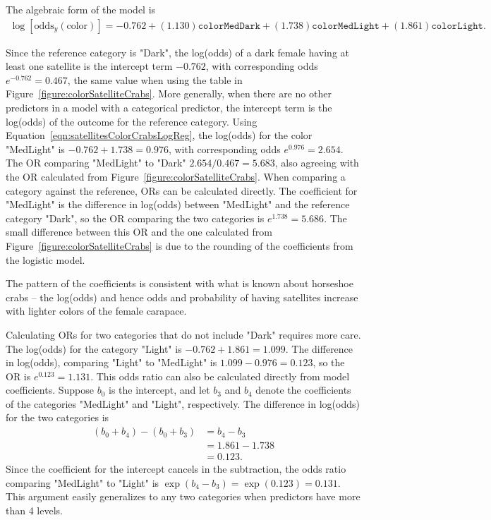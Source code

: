 The algebraic form of the model is
\begin{align}
\log\left[\text{odds}_{y}(\text{color})\right] = -0.762 + (1.130)\texttt{colorMedDark}
 + (1.738)\texttt{colorMedLight} + (1.861)\texttt{colorLight}.
 \label{eqn:satellitesColorCrabsLogReg}
\end{align}

Since the reference category is "Dark", the log(odds) of a dark female having at least one satellite is the intercept term $-0.762$, with corresponding odds $e^{-0.762} = 0.467$, the same value when using the table in Figure~\ref{figure:colorSatelliteCrabs}.  More generally, when there are no other predictors in a model with a categorical predictor, the intercept term is the log(odds) of the outcome for the reference category. Using Equation~\ref{eqn:satellitesColorCrabsLogReg}, the log(odds) for the color "MedLight" is $-0.762 + 1.738 = 0.976$, with corresponding odds $e^{0.976} = 2.654$. The OR comparing "MedLight" to "Dark" $2.654/0.467 = 5.683$, also agreeing with the OR calculated from Figure~\ref{figure:colorSatelliteCrabs}.  When comparing a category against the reference, ORs can be calculated directly.  The coefficient for "MedLight" is the difference in log(odds) between "MedLight" and the reference category "Dark", so the OR comparing the two categories is $e^{1.738} = 5.686$.  The small difference between this OR and the one calculated from Figure~\ref{figure:colorSatelliteCrabs} is due to the rounding of the coefficients from the logistic model.


The pattern of the coefficients is consistent with what is known about horseshoe crabs -- the log(odds) and hence odds and probability of having satellites increase with lighter colors of the female carapace.

Calculating ORs for two categories that do not include "Dark" requires more care.  The log(odds) for the category "Light" is $-0.762 + 1.861 = 1.099$.  The difference in log(odds), comparing "Light" to "MedLight" is $1.099 - 0.976 = 0.123$, so the OR is $e^{0.123} = 1.131$.  This odds ratio can also be calculated directly from model coefficients.  Suppose $b_0$ is the intercept, and let $b_3$ and $b_4$ denote the coefficients of the categories "MedLight" and "Light", respectively.  The difference in log(odds) for the two categories is
\begin{align*}
   (b_0 + b_4) - (b_0 + b_3) &= b_4 - b_3 \\
      &= 1.861 - 1.738 \\
      &= 0.123.
\end{align*}
Since the coefficient for the intercept cancels in the subtraction, the odds ratio comparing "MedLight" to "Light" is $\exp(b_4 - b_3) = \exp(0.123) = 0.131$.  This argument easily generalizes to any two categories when predictors have more than 4 levels.


